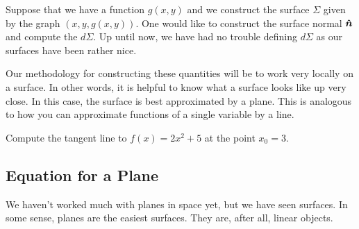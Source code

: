                  Suppose that we have a function $g(x,y)$ and we construct the surface $\Sigma$ given by the graph $(x,y,g(x,y))$.  One would like to construct the surface normal $\boldsymbol{\hat{n}}$ and compute the  $d\Sigma$. Up until now, we have had no trouble defining $d\Sigma$ as our surfaces have been rather nice. 
                 
                 Our methodology for constructing these quantities will be to work very locally on a surface.  In other words, it is helpful to know what a surface looks like up very close.  In this case, the surface is best approximated by a plane.  This is analogous to how you can approximate functions of a single variable by a line.
                                        
                                        \begin{exercise}
                                        Compute the tangent line to $f(x)=2x^2+5$ at the point $x_0=3$.
                                        \end{exercise}
                                        
                                        \subsection{Equation for a Plane}
                                        
                                        We haven't worked much with planes in space yet, but we have seen surfaces.  In some sense, planes are the easiest surfaces.  They are, after all, linear objects. 
                                        
